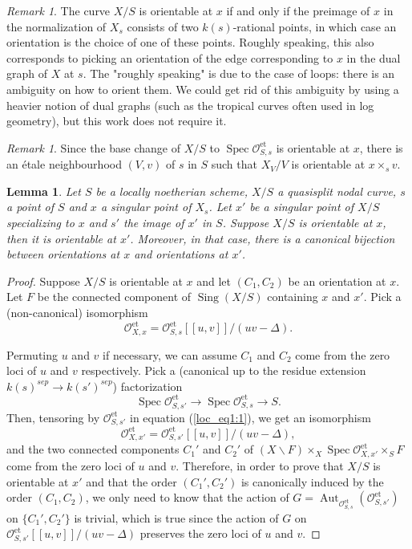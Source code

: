 \documentclass[a4paper,12pt]{amsart} %
\numberwithin{equation}{subsection}
\newcommand{\on}[1]{\operatorname{#1}}
\def\Sing{\operatorname{Sing}}
\newcommand{\Spec}{\operatorname{Spec}}
\theoremstyle{definition}
\theoremstyle{plain}%
\newtheorem{lemma}[definition]{Lemma}
\theoremstyle{remark}
\newtheorem{remark}[definition]{Remark}
\renewcommand{\O}{\mathcal{O}}
\begin{document}
\begin{remark}
The curve $X/S$ is orientable at $x$ if and only if the preimage of $x$ in the normalization of $X_s$ consists of two $k(s)$-rational points, in which case an orientation is the choice of one of these points. Roughly speaking, this also corresponds to picking an orientation of the edge corresponding to $x$ in the dual graph of $X$ at $s$. The "roughly speaking" is due to the case of loops: there is an ambiguity on how to orient them. We could get rid of this ambiguity by using a heavier notion of dual graphs (such as the tropical curves often used in log geometry), but this work does not require it.
\end{remark}

\begin{remark}\label{remark:orientations_exist_locally}
Since the base change of $X/S$ to $\Spec\O_{S,s}^{\on{et}}$ is orientable at $x$, there is an \'etale neighbourhood $(V,v)$ of $s$ in $S$ such that $X_V/V$ is orientable at $x\times_s v$.
\end{remark}

\begin{lemma}\label{lemma:orientations_pass_to_generization}
Let $S$ be a locally noetherian scheme, $X/S$ a quasisplit nodal curve, $s$ a point of $S$ and $x$ a singular point of $X_s$. Let $x'$ be a singular point of $X/S$ specializing to $x$ and $s'$ the image of $x'$ in $S$. Suppose $X/S$ is orientable at $x$, then it is orientable at $x'$. Moreover, in that case, there is a canonical bijection between orientations at $x$ and orientations at $x'$.
\end{lemma}

\begin{proof}
Suppose $X/S$ is orientable at $x$ and let $(C_1,C_2)$ be an orientation at $x$. Let $F$ be the connected component of $\Sing(X/S)$ containing $x$ and $x'$. Pick a (non-canonical) isomorphism
\begin{equation}\label{loc_eq1:1}
\O_{X,x}^{\on{et}}=\O_{S,s}^{\on{et}}[[u,v]]/(uv-\Delta).
\end{equation}

Permuting $u$ and $v$ if necessary, we can assume $C_1$ and $C_2$ come from the zero loci of $u$ and $v$ respectively. Pick a (canonical up to the residue extension $k(s)^{sep} \to k(s')^{sep}$) factorization
\[
\Spec \O_{S,s'}^{\on{et}} \to \Spec \O_{S,s}^{\on{et}} \to S.
\]
Then, tensoring by $\O_{S,s'}^{\on{et}}$ in equation (\ref{loc_eq1:1}), we get an isomorphism
\[
\O_{X,x'}^{\on{et}}=\O_{S,s'}^{\on{et}}[[u,v]]/(uv-\Delta),
\]
and the two connected components $C_1'$ and $C_2'$ of $(X\backslash F)\times_X \Spec\O_{X,x'}^{\on{et}}\times_S F$ come from the zero loci of $u$ and $v$. Therefore, in order to prove that $X/S$ is orientable at $x'$ and that the order $(C_1',C_2')$ is canonically induced by the order $(C_1,C_2)$, we only need to know that the action of $G=\operatorname{Aut}_{\O_{S,s}^{\on{et}}}(\O_{S,s'}^{\on{et}})$ on $\{C_1',C_2'\}$ is trivial, which is true since the action of $G$ on $\O_{S,s'}^{\on{et}}[[u,v]]/(uv-\Delta)$ preserves the zero loci of $u$ and $v$.
\end{proof}
\end{document}
